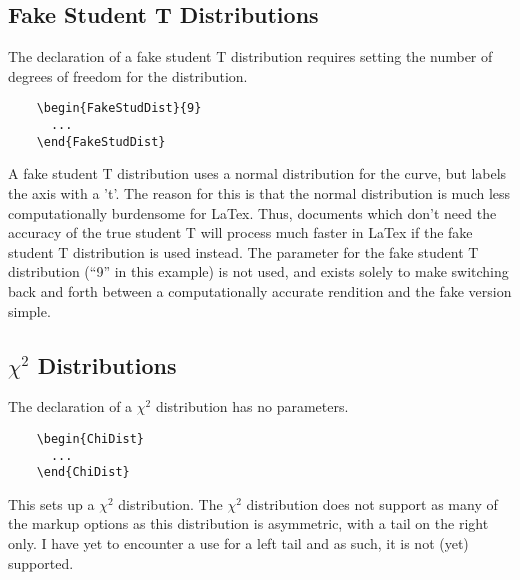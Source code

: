 \documentclass[11pt,letterpaper]{article}
\begin{document}
\subsection{Fake Student T Distributions}

The declaration of a fake student T distribution requires setting the
number of degrees of freedom for the distribution.

  \begin{minipage}{0.3\textwidth}
  \begin{lstlisting}
    \begin{FakeStudDist}{9}
      ...
    \end{FakeStudDist}
  \end{lstlisting}
  \end{minipage}
  \begin{minipage}{0.6\textwidth}
    A fake student T distribution uses a normal distribution for the
    curve, but labels the axis with a 't'.  The reason for this is
    that the normal distribution is much less computationally
    burdensome for LaTex.  Thus, documents which don't need the
    accuracy of the true student T will process much faster in LaTex
    if the fake student T distribution is used instead.  The parameter
    for the fake student T distribution (``9'' in this example) is not
    used, and exists solely to make switching back and forth between a
    computationally accurate rendition and the fake version simple.
  \end{minipage}

\subsection{$\chi^2$ Distributions}

The declaration of a $\chi^2$ distribution has no parameters.

  \begin{minipage}{0.3\textwidth}
  \begin{lstlisting}
    \begin{ChiDist}
      ...
    \end{ChiDist}
  \end{lstlisting}
  \end{minipage}
  \begin{minipage}{0.6\textwidth}
    This sets up a $\chi^2$ distribution.  The $\chi^2$ distribution
    does not support as many of the markup options as this distribution
    is asymmetric, with a tail on the right only.  I have yet to encounter
    a use for a left tail and as such, it is not (yet) supported.
  \end{minipage}
\end{document}
